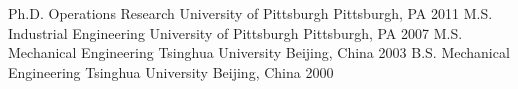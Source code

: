 
\begin{cveducations}

  \cveducation 
    {Ph.D.}                                                     %
    {Operations Research}          %
    {University of Pittsburgh}
    {Pittsburgh, PA}                                           %
    {2011}                                                      %
\cveducation 
    {M.S.}                                                     %
    {Industrial Engineering}          %
    {University of Pittsburgh}
    {Pittsburgh, PA}                                           %
    {2007} 
  \cveducation
    {M.S.}    %
    {Mechanical Engineering}               %
    {Tsinghua University}
    {Beijing, China}                    %
    {2003}                              %
  \cveducation
    {B.S.}    %
    {Mechanical Engineering}               %
    {Tsinghua University}
    {Beijing, China}                    %
    {2000}                              %
\end{cveducations}

